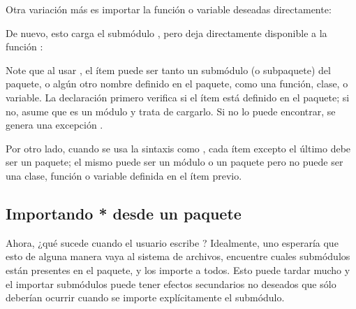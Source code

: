 \documentclass[a4,10pt,spanish]{sphinxmanual}
\begin{document}
\begin{sphinxVerbatim}[commandchars=\\\{\}]
   
\end{sphinxVerbatim}

\sphinxAtStartPar
Otra variación más es importar la función o variable deseadas directamente:

\begin{sphinxVerbatim}[commandchars=\\\{\}]
   
\end{sphinxVerbatim}

\sphinxAtStartPar
De nuevo, esto carga el submódulo , pero deja directamente disponible a la función :

\begin{sphinxVerbatim}[commandchars=\\\{\}]
   
\end{sphinxVerbatim}

\sphinxAtStartPar
Note que al usar , el ítem puede ser tanto un submódulo (o subpaquete) del paquete, o algún otro nombre definido en el paquete, como una función, clase, o variable.  La declaración  primero verifica si el ítem está definido en el paquete; si no, asume que es un módulo y trata de cargarlo.  Si no lo puede encontrar, se genera una excepción .

\sphinxAtStartPar
Por otro lado, cuando se usa la sintaxis como , cada ítem excepto el último debe ser un paquete; el mismo puede ser un módulo o un paquete pero no puede ser una clase, función o variable definida en el ítem previo.


\subsection{Importando * desde un paquete}
\label{\detokenize{tutorial/modules:importing-from-a-package}}\label{\detokenize{tutorial/modules:tut-pkg-import-star}}
\ignorespaces 
\sphinxAtStartPar
Ahora, ¿qué sucede cuando el usuario escribe ? Idealmente, uno esperaría que esto de alguna manera vaya al sistema de archivos, encuentre cuales submódulos están presentes en el paquete, y los importe a todos. Esto puede tardar mucho y el importar sub\sphinxhyphen{}módulos puede tener efectos secundarios no deseados que sólo deberían ocurrir cuando se importe explícitamente el sub\sphinxhyphen{}módulo.
\end{document}
